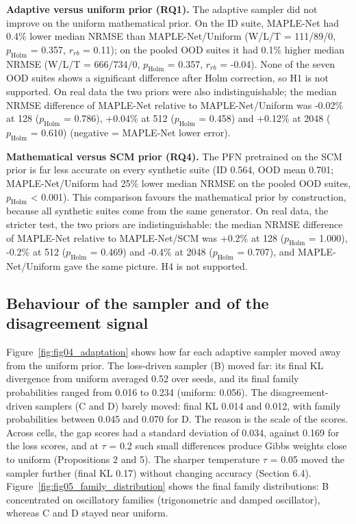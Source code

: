 \documentclass[mathematics,article,submit,pdftex,moreauthors]{Definitions/mdpi}
\begin{document}
\textbf{Adaptive versus uniform prior (RQ1).} The adaptive sampler did not improve on the uniform mathematical prior. On the ID suite, MAPLE-Net had 0.4\% lower median NRMSE than MAPLE-Net/Uniform (W/L/T = 111/89/0, $p_{\mathrm{Holm}}$ = 0.357, $r_{rb}$ = 0.11); on the pooled OOD suites it had 0.1\% higher median NRMSE (W/L/T = 666/734/0, $p_{\mathrm{Holm}}$ = 0.357, $r_{rb}$ = -0.04). None of the seven OOD suites shows a significant difference after Holm correction, so H1 is not supported. On real data the two priors were also indistinguishable; the median NRMSE difference of MAPLE-Net relative to MAPLE-Net/Uniform was -0.02\% at 128 ($p_{\mathrm{Holm}}$ = 0.786), +0.04\% at 512 ($p_{\mathrm{Holm}}$ = 0.458) and +0.12\% at 2048 ($p_{\mathrm{Holm}}$ = 0.610) (negative = MAPLE-Net lower error).

\textbf{Mathematical versus SCM prior (RQ4).} The PFN pretrained on the SCM prior is far less accurate on every synthetic suite (ID 0.564, OOD mean 0.701; MAPLE-Net/Uniform had 25\% lower median NRMSE on the pooled OOD suites, $p_{\mathrm{Holm}}$ < 0.001). This comparison favours the mathematical prior by construction, because all synthetic suites come from the same generator. On real data, the stricter test, the two priors are indistinguishable: the median NRMSE difference of MAPLE-Net relative to MAPLE-Net/SCM was +0.2\% at 128 ($p_{\mathrm{Holm}}$ = 1.000), -0.2\% at 512 ($p_{\mathrm{Holm}}$ = 0.469) and -0.4\% at 2048 ($p_{\mathrm{Holm}}$ = 0.707), and MAPLE-Net/Uniform gave the same picture. H4 is not supported.

\subsection{Behaviour of the sampler and of the disagreement signal}

Figure~\ref{fig:fig04_adaptation} shows how far each adaptive sampler moved away from the uniform prior. The loss-driven sampler (B) moved far: its final KL divergence from uniform averaged 0.52 over seeds, and its final family probabilities ranged from 0.016 to 0.234 (uniform: 0.056). The disagreement-driven samplers (C and D) barely moved: final KL 0.014 and 0.012, with family probabilities between 0.045 and 0.070 for D. The reason is the scale of the scores. Across cells, the gap scores had a standard deviation of 0.034, against 0.169 for the loss scores, and at $\tau$ = 0.2 such small differences produce Gibbs weights close to uniform (Propositions 2 and 5). The sharper temperature $\tau$ = 0.05 moved the sampler further (final KL 0.17) without changing accuracy (Section 6.4). Figure~\ref{fig:fig05_family_distribution} shows the final family distributions: B concentrated on oscillatory families (trigonometric and damped oscillator), whereas C and D stayed near uniform.
\end{document}
